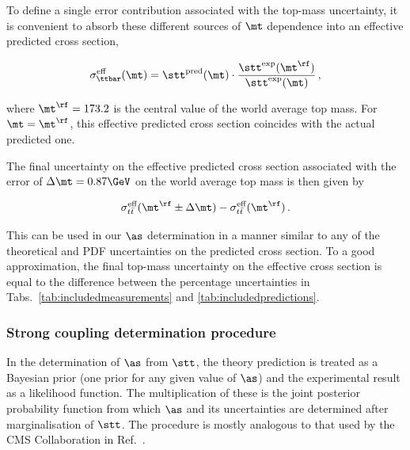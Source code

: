 To define a single error contribution associated with the
top-mass uncertainty, it is convenient to absorb these different
sources of $\mt$ dependence into an effective predicted cross section,
\begin{linenomath*}
\begin{equation}
  \label{eq:eff-mtop-dep}
\sigma_{\ttbar}^{\text{eff}}(\mt) = 
    \stt^{\text{pred}} (  \mt  ) \cdot 
        \frac{
            \stt^{\text{exp}} (  \mt^\rf  )
            }{
            \stt^{\text{exp}} (  \mt  )
            }\,,
\end{equation}
\end{linenomath*}
where $\mt^\rf = 173.2$ is the central value of the world average top
mass.
%
For $\mt = \mt^\rf$, this effective predicted cross section coincides
with the actual predicted one.

The final uncertainty on the effective predicted cross section
associated with the error of $\Delta \mt = 0.87\GeV$ on the world
average top mass is then given by
\begin{linenomath*}
\begin{equation}
  \label{eq:mtop-uncertainty-impact}
  \sigma_{t\bar{t}}^{\text{eff}}(\mt^\rf \pm \Delta \mt) - 
  \sigma_{t\bar{t}}^{\text{eff}}(\mt^\rf)\,.
\end{equation}
\end{linenomath*}
This can be used in our $\as$ determination in a manner similar to
any of the theoretical and PDF uncertainties on the predicted cross
section.
% 
To a good approximation, the final top-mass uncertainty on the
effective cross section is equal to the difference between the
percentage uncertainties in Tabs.~\ref{tab:includedmeasurements} and
\ref{tab:includedpredictions}.
%

\subsubsection{Strong coupling determination procedure}
\label{sec:determination-procedure}

In the determination of $\as$ from $\stt$, the theory prediction is
treated as a Bayesian prior (one prior for any given value of $\as$)
and the experimental result as a likelihood function.  The
multiplication of these is the joint posterior probability function
from which $\as$ and its uncertainties are determined after
marginalisation of $\stt$.  The procedure is mostly analogous to that
used by the CMS Collaboration in Ref.~\cite{Chatrchyan:2013haa}.

